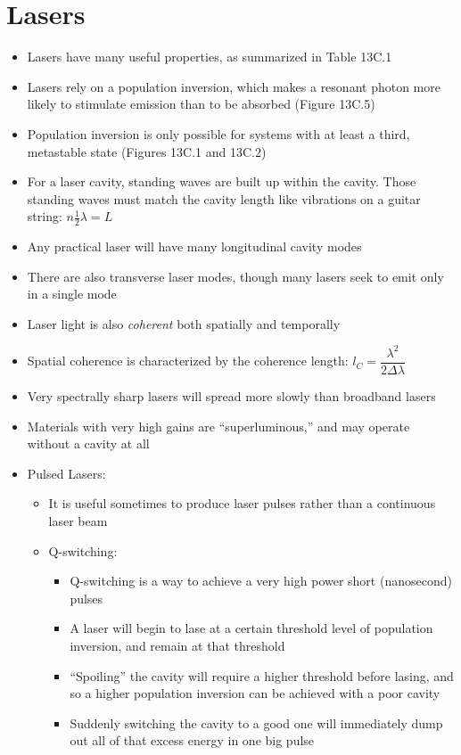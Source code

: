 \documentclass[12pt, openany, letterpaper]{memoir}
\begin{document}
\section*{Lasers}
\begin{itemize}
	\item Lasers have many useful properties, as summarized in Table 13C.1
	\item Lasers rely on a population inversion, which makes a resonant photon more likely to stimulate emission than to be absorbed (Figure 13C.5)
	\item Population inversion is only possible for systems with at least a third, metastable state (Figures 13C.1 and 13C.2)
	\item For a laser cavity, standing waves are built up within the cavity. Those standing waves must match the cavity length like vibrations on a guitar string: $n\frac{1}{2}\lambda=L$
	\item Any practical laser will have many longitudinal cavity modes
	\item There are also transverse laser modes, though many lasers seek to emit only in a single mode
	\item Laser light is also \emph{coherent} both spatially and temporally
	\item Spatial coherence is characterized by the coherence length: $l_C=\dfrac{\lambda^2}{2\Delta \lambda}$
	\item Very spectrally sharp lasers will spread more slowly than broadband lasers
	\item Materials with very high gains are ``superluminous,'' and may operate without a cavity at all
	\item Pulsed Lasers:
	\begin{itemize}
		\item It is useful sometimes to produce laser pulses rather than a continuous laser beam
		\item Q-switching:
		\begin{itemize}
			\item Q-switching is a way to achieve a very high power short (nanosecond) pulses
			\item A laser will begin to lase at a certain threshold level of population inversion, and remain at that threshold
			\item “Spoiling” the cavity will require a higher threshold before lasing, and so a higher population inversion can be achieved with a poor cavity
			\item Suddenly switching the cavity to a good one will immediately dump out all of that excess energy in one big pulse

\end{itemize}
\end{itemize}
\end{itemize}
\end{document}
